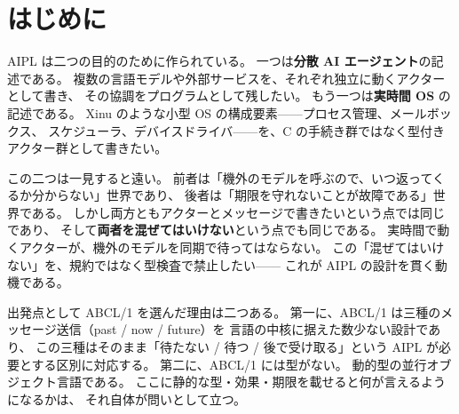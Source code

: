 \documentclass[11pt,a4paper]{ltjsarticle}
\theoremstyle{definition}
\theoremstyle{remark}
\begin{document}
\begin{abstract}
最後に、実測によって確認できた穴を二つ報告し、\textbf{三実装とも直した}。
\texttt{now} を \texttt{future} と \texttt{await} に分けて書くと効果検査を逃れること、
および異なるクラスのアクター型が単一化してしまうことである。
どちらも最小例で再現したうえで修正し、
手元の \texttt{.aipl} 543 本を修正前後に通して、
判定が変わったのが\textbf{狙ったテストだけ}であることを確かめた。
併せて「弾かれるべきプログラム」を資産として持つ仕組みを作ったところ、
出力の比較では見えなかった実装間の食い違いが五つ出た ----
効果伝播の穴は正であるはずの OCaml 版だけのものであり、
JS-I は効果を集めていながら宣言と照合しておらず、
Py-I はトップレベルの呼び出しの引数を一つも検査していなかった。
さらに探りを入れて、三実装すべてに共通する穴を一つ見つけた ----
\textbf{未宣言の名前への代入が黙って通る}。
フィールド名を打ち間違えると、フィールドは更新されないまま別の変数ができ、
何のエラーも出ない。これも三実装とも直した。
弾かれるべきプログラムは 8 本から 15 本に増え、
期待と食い違う枠は 45 枠中 9 枠、OCaml 版は 15 本すべてを弾く。
最後に、小林直樹の型システム研究の系譜が、
AIPL が未解決として残した設計課題にどう噛み合うかを整理する。
\end{abstract}

\tableofcontents
\newpage

\section{はじめに}
\label{sec:intro}

AIPL は二つの目的のために作られている。
一つは\textbf{分散 AI エージェント}の記述である。
複数の言語モデルや外部サービスを、それぞれ独立に動くアクターとして書き、
その協調をプログラムとして残したい。
もう一つは\textbf{実時間 OS} の記述である。
Xinu のような小型 OS の構成要素——プロセス管理、メールボックス、
スケジューラ、デバイスドライバ——を、C の手続き群ではなく型付きアクター群として書きたい。

この二つは一見すると遠い。
前者は「機外のモデルを呼ぶので、いつ返ってくるか分からない」世界であり、
後者は「期限を守れないことが故障である」世界である。
しかし両方ともアクターとメッセージで書きたいという点では同じであり、
そして\textbf{両者を混ぜてはいけない}という点でも同じである。
実時間で動くアクターが、機外のモデルを同期で待ってはならない。
この「混ぜてはいけない」を、規約ではなく型検査で禁止したい——
これが AIPL の設計を貫く動機である。

出発点として ABCL/1 を選んだ理由は二つある。
第一に、ABCL/1 は三種のメッセージ送信（past / now / future）を
言語の中核に据えた数少ない設計であり、
この三種はそのまま「待たない / 待つ / 後で受け取る」という
AIPL が必要とする区別に対応する。
第二に、ABCL/1 には型がない。
動的型の並行オブジェクト言語である。
ここに静的な型・効果・期限を載せると何が言えるようになるかは、
それ自体が問いとして立つ。
\end{document}

